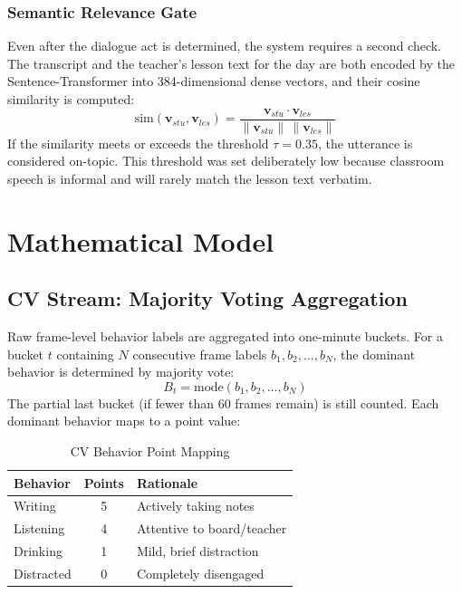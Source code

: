 \documentclass[conference]{IEEEtran}
\begin{document}
\subsubsection{Semantic Relevance Gate}
Even after the dialogue act is determined, the system requires a second check. The transcript and the teacher's lesson text for the day are both encoded by the Sentence-Transformer into 384-dimensional dense vectors, and their cosine similarity is computed:
\begin{equation}
\text{sim}(\mathbf{v}_{stu}, \mathbf{v}_{les}) = \frac{\mathbf{v}_{stu} \cdot \mathbf{v}_{les}}{\|\mathbf{v}_{stu}\| \, \|\mathbf{v}_{les}\|}
\label{eq:cosine}
\end{equation}
If the similarity meets or exceeds the threshold $\tau = 0.35$, the utterance is considered on-topic. This threshold was set deliberately low because classroom speech is informal and will rarely match the lesson text verbatim.
\section{Mathematical Model}
\subsection{CV Stream: Majority Voting Aggregation}
Raw frame-level behavior labels are aggregated into one-minute buckets. For a bucket $t$ containing $N$ consecutive frame labels $b_1, b_2, \ldots, b_N$, the dominant behavior is determined by majority vote:
\begin{equation}
B_t = \text{mode}(b_1, b_2, \ldots, b_N)
\label{eq:mode}
\end{equation}
The partial last bucket (if fewer than 60 frames remain) is still counted. Each dominant behavior maps to a point value:
\begin{table}[htbp]
\caption{CV Behavior Point Mapping}
\begin{center}
\begin{tabular}{|l|c|l|}
\hline
\textbf{Behavior} & \textbf{Points} & \textbf{Rationale} \\
\hline
Writing & 5 & Actively taking notes \\
Listening & 4 & Attentive to board/teacher \\
Drinking & 1 & Mild, brief distraction \\
Distracted & 0 & Completely disengaged \\
\hline
\end{tabular}
\label{tab:cv_points}
\end{center}
\end{table}
\end{document}
